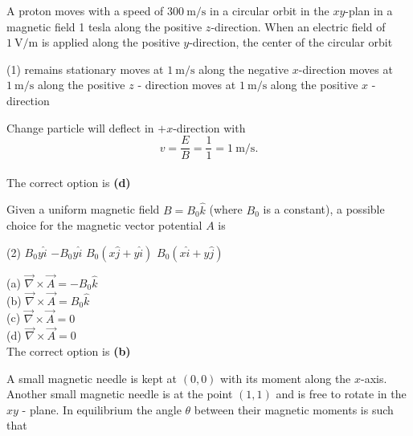 \begin{enumerate}
\begin{answer}
\end{answer}
\begin{minipage}{\textwidth}
	\item A proton moves with a speed of $300 \mathrm{~m} / \mathrm{s}$ in a circular orbit in the $x y$-plan in a magnetic field 1 tesla along the positive $z$-direction. When an electric field of $1 \mathrm{~V} / \mathrm{m}$ is applied along the positive $y$-direction, the center of the circular orbit
\end{minipage}
\begin{tasks}(1)
	\task[\textbf{A.}] remains stationary
	\task[\textbf{B.}]moves at $1 \mathrm{~m} / \mathrm{s}$ along the negative $x$-direction
	\task[\textbf{C.}]moves at $1 \mathrm{~m} / \mathrm{s}$ along the positive $z$ - direction
	\task[\textbf{D.}] moves at $1 \mathrm{~m} / \mathrm{s}$ along the positive $x$ - direction
\end{tasks}
\begin{answer}
	Change particle will deflect in $+x$-direction with $$v=\frac{E}{B}=\frac{1}{1}=1 \mathrm{~m} / \mathrm{s} .$$\\
	The correct option is \textbf{(d)}	
\end{answer}
\begin{minipage}{\textwidth}
	\item Given a uniform magnetic field $B=B_{0} \hat{k}$ (where $B_{0}$ is a constant), a possible choice for the magnetic vector potential $A$ is
\end{minipage}
\begin{tasks}(2)
	\task[\textbf{A.}] $B_{0} y \hat{i}$
	\task[\textbf{B.}] $-B_{0} y \hat{i}$
	\task[\textbf{C.}] $B_{0}(x \hat{j}+y \hat{i})$
	\task[\textbf{D.}]$B_{0}(x \hat{i}+y \hat{j})$
\end{tasks}
\begin{answer}
	(a) $\vec{\nabla} \times \vec{A}=-B_{0} \hat{k}$\\
	(b) $\vec{\nabla} \times \vec{A}=B_{0} \hat{k}$\\
	(c) $\vec{\nabla} \times \vec{A}=0$\\
	(d) $\vec{\nabla} \times \vec{A}=0$\\
	The correct option is \textbf{(b)}	
\end{answer}
\begin{minipage}{\textwidth}
	\item A small magnetic needle is kept at $(0,0)$ with its moment along the $x$-axis. Another small magnetic needle is at the point $(1,1)$ and is free to rotate in the $x y$ - plane. In equilibrium the angle $\theta$ between their magnetic moments is such that

\end{minipage}
\end{enumerate}
